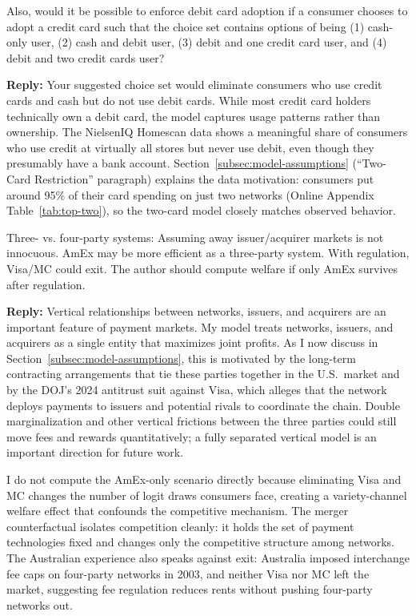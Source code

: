 \documentclass[main.tex]{subfiles}
\begin{document}
\begin{refsection}
\begin{refcommentnoclear}
Also, would it be possible to enforce debit card adoption if a consumer chooses to adopt a credit card such that the choice set contains options of being (1) cash-only user, (2) cash and debit user, (3) debit and one credit card user, and (4) debit and two credit cards user?
\end{refcommentnoclear}

\textbf{Reply:} Your suggested choice set would eliminate consumers who use credit cards and cash but do not use debit cards.
While most credit card holders technically own a debit card, the model captures usage patterns rather than ownership.
The NielsenIQ Homescan data shows a meaningful share of consumers who use credit at virtually all stores but never use debit, even though they presumably have a bank account.
Section~\ref{subsec:model-assumptions} (``Two-Card Restriction'' paragraph) explains the data motivation: consumers put around 95\% of their card spending on just two networks (Online Appendix Table~\ref{tab:top-two}), so the two-card model closely matches observed behavior.

\begin{refcommentnoclear}
Three- vs. four-party systems: Assuming away issuer/acquirer markets is not innocuous.
AmEx may be more efficient as a three-party system.
With regulation, Visa/MC could exit.
The author should compute welfare if only AmEx survives after regulation.

\end{refcommentnoclear}

\textbf{Reply:} Vertical relationships between networks, issuers, and acquirers are an important feature of payment markets.
My model treats networks, issuers, and acquirers as a single entity that maximizes joint profits.
As I now discuss in Section~\ref{subsec:model-assumptions}, this is motivated by the long-term contracting arrangements that tie these parties together in the U.S.\ market and by the DOJ's 2024 antitrust suit against Visa, which alleges that the network deploys payments to issuers and potential rivals to coordinate the chain.
Double marginalization and other vertical frictions between the three parties could still move fees and rewards quantitatively; a fully separated vertical model is an important direction for future work.

I do not compute the AmEx-only scenario directly because eliminating Visa and MC changes the number of logit draws consumers face, creating a variety-channel welfare effect that confounds the competitive mechanism.
The merger counterfactual isolates competition cleanly: it holds the set of payment technologies fixed and changes only the competitive structure among networks.
The Australian experience also speaks against exit: Australia imposed interchange fee caps on four-party networks in 2003, and neither Visa nor MC left the market, suggesting fee regulation reduces rents without pushing four-party networks out.


\end{refsection}
\end{document}
